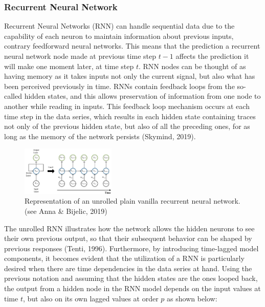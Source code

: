\documentclass[a4paper,11pt,oneside]{book}
\begin{document}
\subsubsection{Recurrent Neural Network}
Recurrent Neural Networks
(RNN) can handle sequential data due to the capability of each neuron to
maintain information about previous inputs, contrary feedforward neural networks. This means that the prediction a recurrent
neural network node made at previous time step $t-1$ affects the prediction it will make one
moment later, at time step $t$. RNN nodes can be thought of as having memory as it takes inputs not only the current signal, but also
what has been perceived previously in time.\newline\newline
RNNs contain feedback loops from the so-called hidden states, and this allows preservation of information from one node to another while reading in inputs. This feedback loop
mechanism occurs at each time step in the data series, which results in each hidden
state containing traces not only of the previous hidden state, but also of all the
preceding ones, for as long as the memory of the network persists (Skymind, 2019).

\begin{figure}
	\centering
	\includegraphics[width=0.4\textwidth]{figures/RNN}
	\caption{Representation of an unrolled plain vanilla recurrent neural network. (see Anna \& Bijelic, 2019)}
	
	\label{seventhfig}
\end{figure}

The unrolled RNN illustrates how the network allows the hidden neurons to see their
own previous output, so that their subsequent behavior can be shaped by previous
responses (Tenti, 1996). Furthermore, by introducing time-lagged model components,
it becomes evident that the utilization of a RNN is particularly desired when there are
time dependencies in the data series at hand.
Using the previous notation and assuming that the hidden states are the ones looped
back, the output from a hidden node in the RNN model depends on the input values at
time $t$, but also on its own lagged values at order $p$ as shown below:
\end{document}
